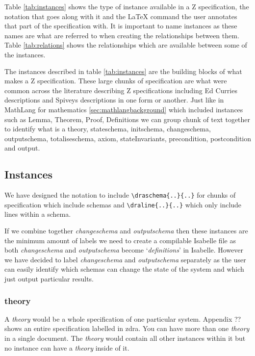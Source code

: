 Table \ref{tab:instances} shows the type of instance available in a Z
specification, the notation that goes along with it and the \LaTeX{} command the
user annotates that part of the specification with. It is important to name
instances as these names are what are referred to when creating the
relationships between them. Table \ref{tab:relations} shows the relationships
which are available between some of the instances. 

The instances described in table \ref{tab:instances} are the building blocks of
what makes a Z specification. These large chunks of specification are what were
common across the literature describing Z specifications including Ed Curries descriptions \cite{essenceofz} and Spiveys descriptions
\cite{spiveyreferencemanual} in one form or another. Just like in MathLang for
mathematics \ref{sec:mathlangbackground} which included instances such as Lemma,
Theorem, Proof, Definitions we can group chunk of text together to identify what
is a theory, stateschema, initschema, changeschema, outputschema,
totaliseschema, axiom, stateInvariants, precondition, postcondition and output.

\subsection{Instances}

We have designed the notation to include \verb|\draschema{..}{..}| for chunks of
specification which include schemas and \verb|\draline{..}{..}| which only
include lines within a schema.

If we combine together \emph{changeschema} and \emph{outputschema} then these
instances are the minimum amount of labels we need to create a compilable
Isabelle file as both \emph{changeschema} and \emph{outputschema} become
`\emph{definitions}' in Isabelle. However we have decided to label
\emph{changeschema} and \emph{outputschema} separately as the user can easily
identify which schemas can change the state of the system and which just output
particular results.

\subsubsection{theory}

A \emph{theory} would be a whole specification of one particular system.
Appendix ?? shows an entire specification labelled in \gls{zdra}. You can have
more than one \emph{theory} in a single document. The \emph{theory} would
contain all other instances within it but no instance can have a \emph{theory}
inside of it.

